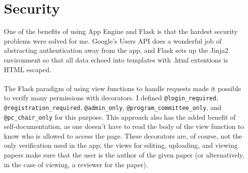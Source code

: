 \documentclass[12pt]{article}
\begin{document}
\section{Security}
	One of the benefits of using App Engine and Flask is that the hardest
	security problems were solved for me. Google's Users API does a
	wonderful job of abstracting authentication away from the app, and
	Flask sets up the Jinja2 environment so that all data echoed into
	templates with .html extentions is HTML escaped.
	\\\\
	The Flask paradigm of using view functions to handle requests made
	it possible to verify many permissions with decorators. I defined
	\texttt{@login\_required}, \texttt{@registration\_required},
	\texttt{@admin\_only}, \texttt{@program\_committee\_only}, and
	\texttt{@pc\_chair\_only} for this purpose. This approach also
	has the added benefit of self-documentation, as one doesn't have
	to read the body of the view function to know who is allowed to
	access the page. These decorators are, of course, not the only
	verification used in the app; the views for editing, uploading, and
	viewing papers make sure that the user is the author of the given paper
	(or alternatively, in the case of viewing, a reviewer for the paper).
	\\\\



\end{document}

